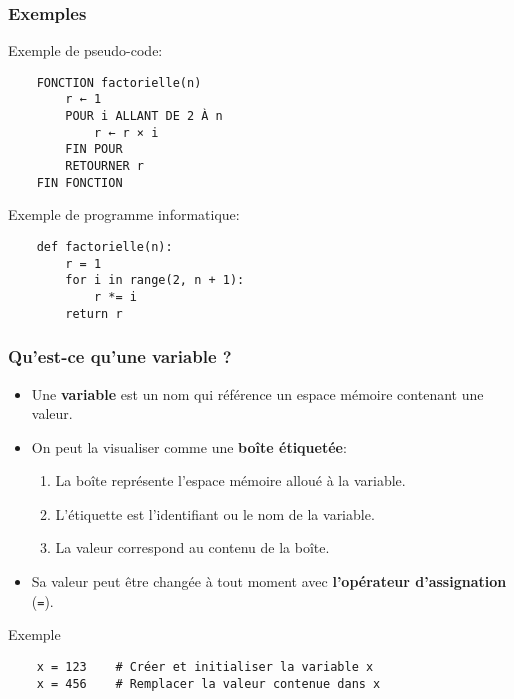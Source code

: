 \documentclass{beamer}
\begin{document}
\begin{frame}[fragile]

    \frametitle{Exemples}
    \vspace{1em}
    
    Exemple de pseudo-code:
    \vspace{0.25em}
    \begin{verbatim}
    FONCTION factorielle(n)
        r ← 1
        POUR i ALLANT DE 2 À n
            r ← r × i
        FIN POUR
        RETOURNER r
    FIN FONCTION
    \end{verbatim}
    \vspace{0.25em}
    Exemple de programme informatique:
    \vspace{0.25em}
    \begin{verbatim}
    def factorielle(n):
        r = 1
        for i in range(2, n + 1):
            r *= i
        return r
    \end{verbatim}

\end{frame}

\begin{frame}[fragile]
    
    \frametitle{Qu’est-ce qu’une variable ?}
    \vspace{0.5em}
    
    \begin{itemize}
      \item Une \textbf{variable} est un nom qui référence un espace mémoire contenant une valeur.
      \item On peut la visualiser comme une \textbf{boîte étiquetée}:
      \begin{enumerate}
        \item La boîte représente l'espace mémoire alloué à la variable.
        \item L'étiquette est l'identifiant ou le nom de la variable.
        \item La valeur correspond au contenu de la boîte.
      \end{enumerate}
      \item Sa valeur peut être changée à tout moment avec \textbf{l'opérateur d'assignation} (\verb|=|).
    \end{itemize}
    
    \vspace{0.25em}

    \begin{block}{Exemple}
    \begin{verbatim}
    x = 123    # Créer et initialiser la variable x
    x = 456    # Remplacer la valeur contenue dans x
    \end{verbatim}
    \end{block}

\end{frame}
\end{document}

